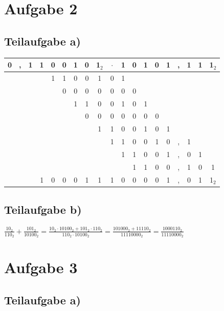 \documentclass{llncs}
\begin{document}
\section*{Aufgabe 2}
\subsection*{Teilaufgabe a)}

\begin{tabular}{ccccccccccccccccccc}
0&,&1&1&0&0&1&0&1$_2$&$\cdot$&1&0&1&0&1&,&1&1&1$_2$\\
\hline
 & & & &1&1&0&0&1&0      &1& & & & & & & & \\
 & & & & &0&0&0&0&0      &0&0& & & & & & & \\
 & & & & & &1&1&0&0      &1&0&1& & & & & & \\
 & & & & & & &0&0&0      &0&0&0&0& & & & & \\
 & & & & & & & &1&1      &0&0&1&0&1& & & & \\
 & & & & & & & & &1      &1&0&0&1&0&,&1& & \\
 & & & & & & & & &       &1&1&0&0&1&,&0&1& \\
 & & & & & & & & &       & &1&1&0&0&,&1&0&1\\
\hline
 & & &1&0&0&0&1&1&1      &0&0&0&0&1&,&0&1&1$_2$\\
\end{tabular}

\subsection*{Teilaufgabe b)}

$\frac{10_2}{110_2} + \frac{101_2}{10100_2} = \frac{10_2 \cdot 10100_2 + 101_2 \cdot 110_2}{110_2 \cdot 10100_2} = \frac{101000_2 + 11110_2}{11110000_2} = \frac{1000110_2}{11110000_2}$
\newpage

\section*{Aufgabe 3}

\subsection*{Teilaufgabe a)}
\end{document}
